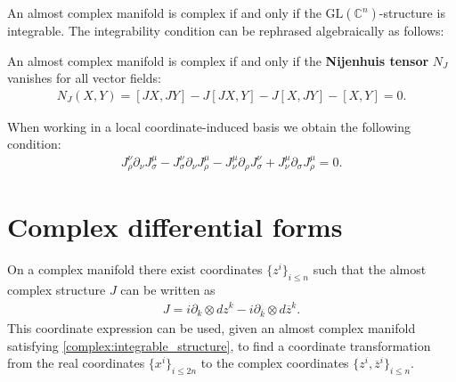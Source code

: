
    \begin{property}
        An almost complex manifold is complex if and only if the $\text{GL}(\mathbb{C}^n)$-structure is integrable. The integrability condition can be rephrased algebraically as follows:
    \end{property}
    \begin{theorem}
        An almost complex manifold is complex if and only if the \textbf{Nijenhuis tensor} $N_J$ vanishes for all vector fields:
        \begin{gather}
            \label{complex:integrable_structure}
            N_J(X, Y) = [JX, JY] - J[JX, Y] - J[X, JY] - [X, Y] = 0.
        \end{gather}
    \end{theorem}
    When working in a local coordinate-induced basis we obtain the following condition:
    \begin{gather}
        J_\rho^\nu\partial_\nu J_\sigma^\mu - J_\sigma^\nu\partial_\nu J_\rho^\mu - J_\nu^\mu\partial_\rho J_\sigma^\nu + J_\nu^\mu\partial_\sigma J_\rho^\mu = 0.
    \end{gather}

\section{Complex differential forms}

    \begin{property}
        On a complex manifold there exist coordinates $\{z^i\}_{i\leq n}$ such that the almost complex structure $J$ can be written as
        \begin{gather}
            \label{complex:complex_structure}
            J = i\partial_k\otimes dz^k - i\partial_{\overline{k}}\otimes d\overline{z}^k.
        \end{gather}
        This coordinate expression can be used, given an almost complex manifold satisfying \ref{complex:integrable_structure}, to find a coordinate transformation from the real coordinates $\{x^i\}_{i\leq2n}$ to the complex coordinates $\{z^i, \overline{z}^i\}_{i\leq n}$.
    \end{property}

